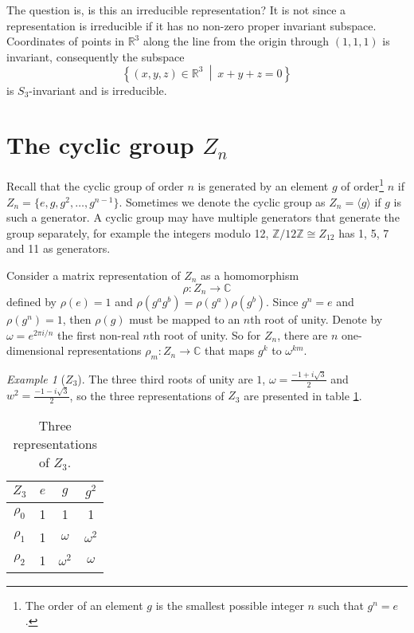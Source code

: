 \documentclass[12pt, a4paper, twoside]{article}
\newcommand{\Z}{\mathbb{Z}}
\newcommand{\R}{\mathbb{R}}
\newcommand{\C}{\mathbb{C}}
\newcommand{\1}{\mathbf{1}}
\theoremstyle{definition}
\theoremstyle{plain}
\theoremstyle{remark}
\newtheorem{example}[definition]{Example}
\begin{document}
	The question is, is this an irreducible representation? It is not since a representation is irreducible if it has no non-zero proper invariant subspace. Coordinates of points in $\R^3$ along the line from the origin through $(1,1,1)$ is invariant, consequently the subspace $$\left\{ (x,y,z) \in \R^3 \ \middle\vert \ x+y+z=0 \right\}$$ is $S_3$-invariant and is irreducible.
	
\section{The cyclic group $Z_n$}

Recall that the cyclic group of order $n$ is generated by an element $g$ of order\footnote{The order of an element $g$ is the smallest possible integer $n$ such that $g^n = e$.} $n$ if $Z_n = \{e, g, g^2, \dots, g^{n-1} \}$. Sometimes we denote the cyclic group as $Z_n = \langle g \rangle$ if $g$ is such a generator. A cyclic group may have multiple generators that generate the group separately, for example the integers modulo 12, $\Z/12\Z \cong Z_{12}$ has 1, 5, 7 and 11 as generators. 

Consider a matrix representation of $Z_n$ as a homomorphism
\[
\rho: Z_n \longrightarrow \C
\]
defined by $\rho(e) = 1$ and $\rho(g^a g^b) = \rho(g^a)\rho(g^b)$. Since $g^n = e$ and $\rho(g^n) = 1$, then $\rho(g)$ must be mapped to an $n$th root of unity. Denote by $\omega = e^{2\pi i/n}$ the first non-real $n$th root of unity. So for $Z_n$, there are $n$ one-dimensional representations $\rho_m: Z_n \rightarrow \C$ that maps $g^k$ to $\omega^{km}$.

\begin{example}[$Z_3$]
	The three third roots of unity are $1$, $\omega = \frac{-1+i\sqrt{3}}{2}$ and $w^2 = \frac{-1-i\sqrt{3}}{2}$, so the three representations of $Z_3$ are presented in table \ref{table:Z3}.
	
	\begin{table}[hbt!]
		\centering
		\caption{Three representations of $Z_3$.}
		\begin{tabular}{c | c c c}
			\label{table:Z3}
			 $Z_3$ & $e$ & $g$        & $g^2$      \\ \hline
			         $\rho_0$          & 1   & 1          & 1          \\
			         $\rho_1$          & 1   & $\omega$   & $\omega^2$ \\
			         $\rho_2$          & 1   & $\omega^2$ & $\omega$
		\end{tabular}
	\end{table}
\end{example}
\end{document}
